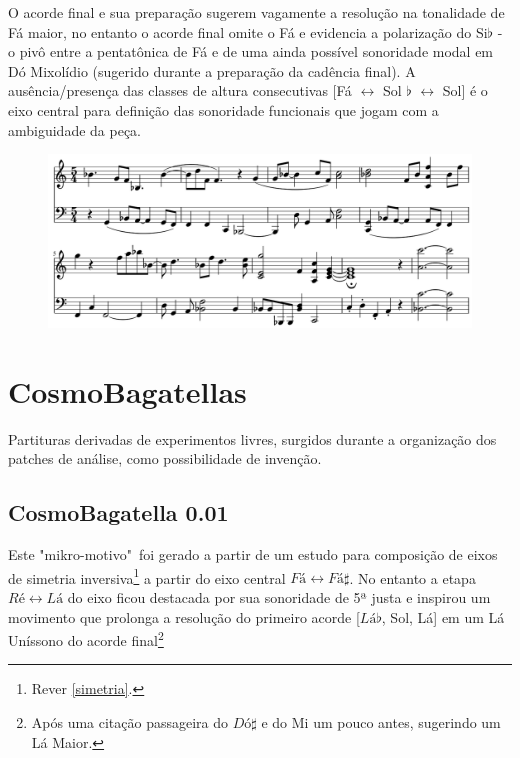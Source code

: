 \documentclass[
	12pt,				%
	openright,			%
	twoside,			%
	a4paper,			%
	english,			%
	french,				%
	spanish,			%
	brazil				%
	]{abntex2}
\begin{document}
O acorde final e sua preparação sugerem vagamente a resolução na tonalidade de Fá maior, no entanto o acorde final omite o Fá e evidencia a polarização do Si$\flat$ - o pivô entre a pentatônica de Fá e de uma ainda possível sonoridade modal em Dó Mixolídio (sugerido durante a preparação da cadência final). A ausência/presença das classes de altura consecutivas [Fá $\leftrightarrow$ Sol $\flat$ $\leftrightarrow$ Sol] é o eixo central para definição das sonoridade funcionais que jogam com a ambiguidade da peça.

\begin{figure}[!h]
	\begin{center}
	    \includegraphics*[scale=0.35]{score/MikroCliche03.png}
	\end{center}
\end{figure}


\pagebreak
\section{CosmoBagatellas}

Partituras derivadas de experimentos livres, surgidos durante a organização dos patches de análise, como possibilidade de invenção. 

\subsection{CosmoBagatella 0.01}

Este "mikro-motivo"\ foi gerado a partir de um estudo para composição de eixos de simetria inversiva\footnote{Rever \autoref{simetria}. } a partir do eixo central $Fá \leftrightarrow Fá\sharp  $. No entanto a etapa $Ré \leftrightarrow Lá$ do eixo ficou destacada por sua sonoridade de 5ª justa e inspirou um movimento que prolonga a resolução do primeiro acorde [$Lá\flat$, Sol, Lá] em um Lá Uníssono do acorde final\footnote{Após uma citação passageira do $Dó\sharp$ e do Mi um pouco antes, sugerindo um Lá Maior.}
\end{document}
